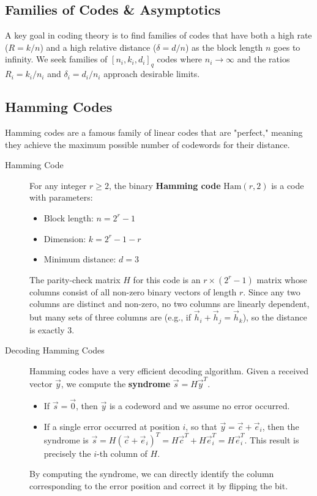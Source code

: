 \subsection{Families of Codes \& Asymptotics}

    A key goal in coding theory is to find families of codes that have both a high rate ($R=k/n$) and a high relative distance ($\delta=d/n$) as the block length $n$ goes to infinity. We seek families of $[n_i, k_i, d_i]_q$ codes where $n_i \to \infty$ and the ratios $R_i = k_i/n_i$ and $\delta_i = d_i/n_i$ approach desirable limits.

\subsection{Hamming Codes}
    Hamming codes are a famous family of linear codes that are "perfect," meaning they achieve the maximum possible number of codewords for their distance.

\begin{description}
    \item[Hamming Code] For any integer $r \ge 2$, the binary \textbf{Hamming code} $\text{Ham}(r, 2)$ is a code with parameters:
    \begin{itemize}
        \item Block length: $n = 2^r - 1$
        \item Dimension: $k = 2^r - 1 - r$
        \item Minimum distance: $d = 3$
    \end{itemize}
    The parity-check matrix $H$ for this code is an $r \times (2^r-1)$ matrix whose columns consist of all non-zero binary vectors of length $r$. Since any two columns are distinct and non-zero, no two columns are linearly dependent, but many sets of three columns are (e.g., if $\vec{h}_i + \vec{h}_j = \vec{h}_k$), so the distance is exactly 3.

    \item[Decoding Hamming Codes] Hamming codes have a very efficient decoding algorithm. Given a received vector $\vec{y}$, we compute the \textbf{syndrome} $\vec{s} = H\vec{y}^T$.
    \begin{itemize}
        \item If $\vec{s} = \vec{0}$, then $\vec{y}$ is a codeword and we assume no error occurred.
        \item If a single error occurred at position $i$, so that $\vec{y} = \vec{c} + \vec{e}_i$, then the syndrome is $\vec{s} = H(\vec{c}+\vec{e}_i)^T = H\vec{c}^T + H\vec{e}_i^T = H\vec{e}_i^T$. This result is precisely the $i$-th column of $H$.
    \end{itemize}
    By computing the syndrome, we can directly identify the column corresponding to the error position and correct it by flipping the bit.
\end{description}

